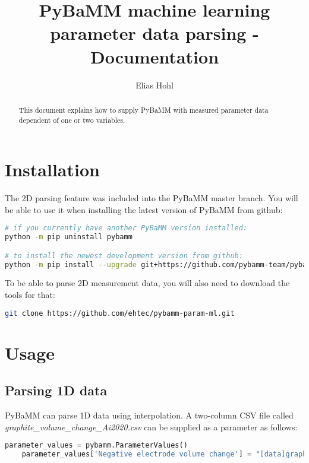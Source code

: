 \documentclass[]{report}
\title{PyBaMM machine learning parameter data parsing - Documentation}
\author{Elias Hohl}
\begin{document}
\maketitle

\begin{abstract}
	This document explains how to supply PyBaMM with measured parameter data dependent of one or two variables.
\end{abstract}

\section{Installation}

The 2D parsing feature was included into the PyBaMM master branch. You will be able to use it when installing the latest version of PyBaMM from github:

\begin{lstlisting}[language=bash]
# if you currently have another PyBaMM version installed:
python -m pip uninstall pybamm

# to install the newest development version from github:
python -m pip install --upgrade git+https://github.com/pybamm-team/pybamm
\end{lstlisting}

To be able to parse 2D measurement data, you will also need to download the tools for that:

\begin{lstlisting}[language=bash]
git clone https://github.com/ehtec/pybamm-param-ml.git
\end{lstlisting}

\section{Usage}

\subsection{Parsing 1D data}

PyBaMM can parse 1D data using interpolation. A two-column CSV file called \textit{graphite\_volume\_change\_Ai2020.csv} can be supplied as a parameter as follows:

\begin{lstlisting}[language=python]
	parameter_values = pybamm.ParameterValues()
	parameter_values['Negative electrode volume change'] = "[data]graphite_volume_change_Ai2020"
\end{lstlisting}
\end{document}
